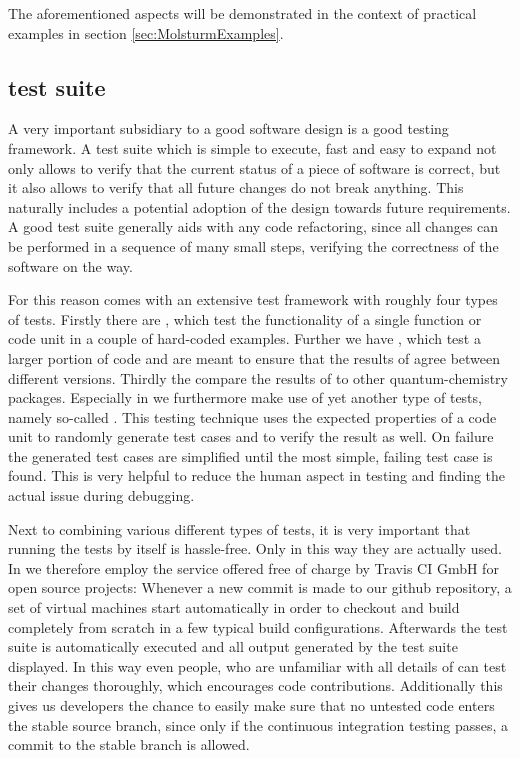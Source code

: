 The aforementioned aspects will be demonstrated
in the context of practical examples in section \vref{sec:MolsturmExamples}.

\subsection{\molsturm test suite}
\label{sec:MolsturmTestSuite}

A very important subsidiary to a good software design is a good testing framework.
A test suite which is simple to execute,
fast and easy to expand not only allows to verify
that the current status of a piece of software is correct,
but it also allows to verify that all future changes do not break anything.
This naturally includes a potential adoption of the design towards future requirements.
A good test suite generally aids with any code refactoring,
since all changes can be performed in a sequence of many small steps,
verifying the correctness of the software on the way.

For this reason \molsturm comes with an extensive test framework
with roughly four types of tests.
Firstly there are ,
which test the functionality of a single function
or code unit in a couple of hard-coded examples.
Further we have ,
which test a larger portion of code and are meant to ensure that
the results of \molsturm agree between different versions.
Thirdly the  compare
the results of \molsturm to other quantum-chemistry packages.
Especially in \lazyten we furthermore make use of yet another type of tests,
namely so-called .
This testing technique uses the expected properties of a code unit
to randomly generate test cases and to verify the result as well.
On failure the generated test cases are simplified until the most simple,
failing test case is found.
This is very helpful
to reduce the human aspect in testing
and finding the actual issue during debugging.

Next to combining various different types of tests,
it is very important that running the tests by itself is hassle-free.
Only in this way they are actually used.
In \molsturm we therefore employ the 
service offered free of charge by Travis CI GmbH for open source projects:
Whenever a new commit is made to our github repository,
a set of virtual machines start automatically
in order to checkout and build \molsturm completely from scratch
in a few typical build configurations.
Afterwards the test suite is automatically executed and
all output generated by the test suite displayed.
In this way even people, who are unfamiliar with all details of \molsturm
can test their changes thoroughly,
which encourages code contributions.
Additionally this gives us \molsturm developers
the chance to easily make sure that no untested code enters the stable source branch,
since only if the continuous integration testing passes,
a commit to the stable branch is allowed.

